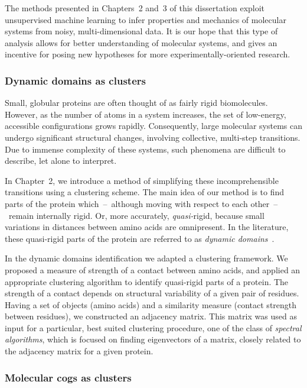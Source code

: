 \documentclass[a4paper,11pt,twoside]{book}%
\begin{document}
The methods presented in Chapters~2 and~3 of this dissertation exploit unsupervised machine learning to infer properties and mechanics of molecular systems from noisy, multi-dimensional data.
It is our hope that this type of analysis allows for better understanding of molecular systems, and gives an incentive for posing new hypotheses for more experimentally-oriented research.

\subsubsection{Dynamic domains as clusters}

Small, globular proteins are often thought of as fairly rigid biomolecules.
However, as the number of atoms in a system increases, the set of low-energy, accessible configurations grows rapidly.
Consequently, large molecular systems can undergo significant structural changes, involving collective, multi-step transitions.
Due to immense complexity of these systems, such phenomena are difficult to describe, let alone to interpret.

In Chapter~2, we introduce a method of simplifying these incomprehensible transitions using a clustering scheme.
The main idea of our method is to find parts of the protein which~--~although moving with respect to each other~--~remain internally rigid.
Or, more accurately, \emph{quasi-}rigid, because small variations in distances between amino acids are omnipresent.
In the literature, these quasi-rigid parts of the protein are referred to as \emph{dynamic domains}~\cite{bahar1997direct,hayward1998systematic,hinsen1998analysis}.

In the dynamic domains identification we adapted a clustering framework.
We proposed a measure of strength of a contact between amino acids, and applied an appropriate clustering algorithm to identify quasi-rigid parts of a protein.
The strength of a contact depends on structural variability of a given pair of residues.
Having a set of objects (amino acids) and a similarity measure (contact strength between residues), we constructed an adjacency matrix.
This matrix was used as input for a particular, best suited clustering procedure, one of the class of \emph{spectral algorithms}, which is focused on finding eigenvectors of a matrix, closely related to the adjacency matrix for a given protein.

\subsubsection{Molecular cogs as clusters}
\end{document}
